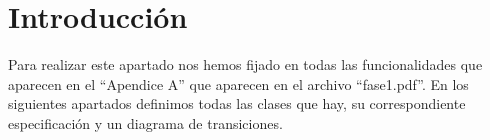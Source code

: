 \section{Introducción}
Para realizar este apartado nos hemos fijado en todas las funcionalidades que aparecen en el ``Apendice A''
que aparecen en el archivo ``fase1.pdf''. En los siguientes apartados definimos todas las clases que hay, su correspondiente especificación 
y un diagrama de transiciones.